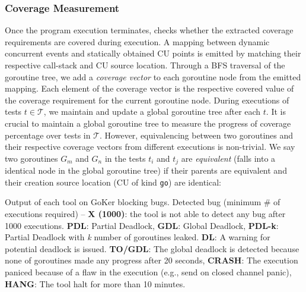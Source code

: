 \subsubsection{Coverage Measurement}
Once the program execution terminates, \goat checks whether the extracted coverage requirements are covered during execution.
%
A mapping between dynamic concurrent events and statically obtained CU points is emitted by matching their respective call-stack and CU source location.
%
Through a BFS traversal of the goroutine tree, we add a \textit{coverage vector} to each goroutine node from the emitted mapping.
%
Each element of the coverage vector is the respective covered value of the coverage requirement for the current goroutine node.
%
During executions of tests $t \in \mathcal{T}$, we maintain and update a global goroutine tree after each $t$.
%
It is crucial to maintain a global goroutine tree to measure the progress of coverage percentage over tests in $\mathcal{T}$.
%
However, equivalencing between two goroutines and their respective coverage vectors from different executions is non-trivial.
%
We say two goroutines $G_m$ and $G_n$ in the tests $t_i$ and $t_j$ are \textit{equivalent} (\ie falls into a identical node in the global goroutine tree) if their parents are equivalent and their creation source location (CU of kind \texttt{go}) are identical:
%


\begin{table}[]
\caption{Output of each tool on GoKer \cite{yuan-gobench-cgo21} blocking bugs. Detected bug (minimum \# of executions required) -- \textbf{X (1000)}: the tool is not able to detect any bug after 1000 executions. \textbf{PDL}: Partial Deadlock, \textbf{GDL}: Global Deadlock, \textbf{PDL-k}: Partial Deadlock with \textit{k} number of goroutines leaked. \textbf{DL}: A warning for potential deadlock is issued. \textbf{TO/GDL}: The global deadlock is detected because none of goroutines made any progress after 20 seconds, \textbf{CRASH}: The execution paniced because of a flaw in the execution (e.g., send on closed channel panic), \textbf{HANG}: The tool halt for more than 10 minutes.}
\centering
\scalebox{0.72}{
    
  }
\label{tab:comparison}
\end{table}
